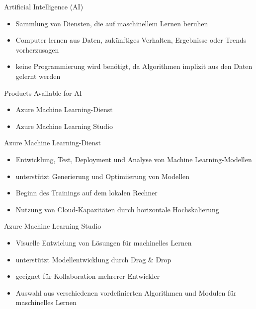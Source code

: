 \begin{flashcard}[Describe]{Artificial Intelligence (AI)}
    \begin{itemize}
        \item Sammlung von Diensten, die auf maschinellem Lernen beruhen
        \item Computer lernen aus Daten, zukünftiges Verhalten, Ergebnisse oder Trends vorherzusagen
        \item keine Programmierung wird benötigt, da Algorithmen implizit aus den Daten gelernt werden
    \end{itemize}

\end{flashcard}

\begin{flashcard}[Describe]{Products Available for AI}
    \begin{itemize}
        \item Azure Machine Learning-Dienst
        \item Azure Machine Learning Studio
    \end{itemize}

\end{flashcard}

\begin{flashcard}[Describe]{Azure Machine Learning-Dienst}
    \begin{itemize}
        \item Entwicklung, Test, Deployment und Analyse von Machine Learning-Modellen
        \item unterstützt Generierung und Optimiierung von Modellen
        \item Beginn des Trainings auf dem lokalen Rechner
        \item Nutzung von Cloud-Kapazitäten durch horizontale Hochskalierung
    \end{itemize}
\end{flashcard}

\begin{flashcard}[Describe]{Azure Machine Learning Studio}
    \begin{itemize}
        \item Visuelle Entwiclung von Lösungen für machinelles Lernen
        \item unterstützt Modellentwicklung durch Drag \& Drop
        \item geeignet für Kollaboration mehrerer Entwickler
        \item Auswahl aus verschiedenen vordefinierten Algorithmen und Modulen für maschinelles Lernen
    \end{itemize}
\end{flashcard}

